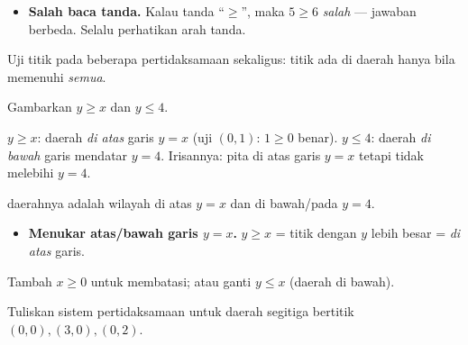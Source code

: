 \begin{jebakan}
\begin{itemize}[leftmargin=*,topsep=2pt]
  \item \textbf{Salah baca tanda.} Kalau tanda ``$\ge$'', maka $5\ge6$
  \emph{salah} --- jawaban berbeda. Selalu perhatikan arah tanda.
\end{itemize}
\end{jebakan}

\begin{variasi}
Uji titik pada beberapa pertidaksamaan sekaligus: titik ada di daerah hanya bila
memenuhi \emph{semua}.
\end{variasi}

\begin{soalbox}{}
Gambarkan $y\ge x$ dan $y\le4$.
\end{soalbox}

\jawab
{} $y\ge x$: daerah \emph{di atas} garis $y=x$ (uji $(0,1)$: $1\ge0$
benar).
 $y\le4$: daerah \emph{di bawah} garis mendatar $y=4$.
 Irisannya: pita di atas garis $y=x$ tetapi tidak melebihi $y=4$.

\begin{center}
\end{center}
\jadi daerahnya adalah wilayah di atas $y=x$ dan di bawah/pada $y=4$.

\begin{jebakan}
\begin{itemize}[leftmargin=*,topsep=2pt]
  \item \textbf{Menukar atas/bawah garis $y=x$.} $y\ge x$ = titik dengan $y$
  lebih besar = \emph{di atas} garis.
\end{itemize}
\end{jebakan}

\begin{variasi}
Tambah $x\ge0$ untuk membatasi; atau ganti $y\le x$ (daerah di bawah).
\end{variasi}

\begin{soalbox}{}
Tuliskan sistem pertidaksamaan untuk daerah segitiga bertitik $(0,0),(3,0),(0,2)$.
\end{soalbox}

